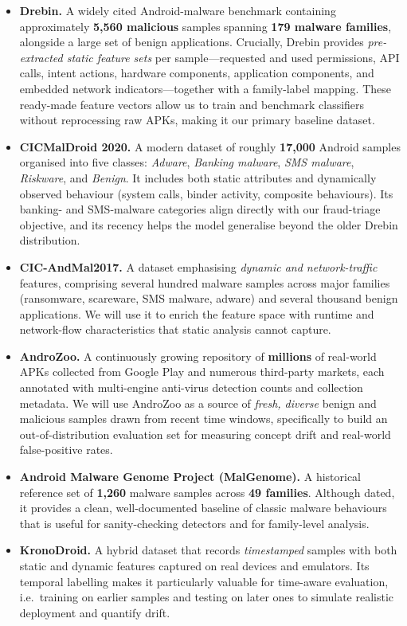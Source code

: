 \documentclass[11pt,a4paper]{article}
\newcommand{\dsname}[1]{\textbf{#1}}
\begin{document}
\begin{itemize}
    \item \dsname{Drebin.} A widely cited Android-malware benchmark containing approximately \textbf{5{,}560 malicious} samples spanning \textbf{179 malware families}, alongside a large set of benign applications. Crucially, Drebin provides \emph{pre-extracted static feature sets} per sample---requested and used permissions, API calls, intent actions, hardware components, application components, and embedded network indicators---together with a family-label mapping. These ready-made feature vectors allow us to train and benchmark classifiers without reprocessing raw APKs, making it our primary baseline dataset.
    \item \dsname{CICMalDroid 2020.} A modern dataset of roughly \textbf{17{,}000} Android samples organised into five classes: \emph{Adware}, \emph{Banking malware}, \emph{SMS malware}, \emph{Riskware}, and \emph{Benign}. It includes both static attributes and dynamically observed behaviour (system calls, binder activity, composite behaviours). Its banking- and SMS-malware categories align directly with our fraud-triage objective, and its recency helps the model generalise beyond the older Drebin distribution.
    \item \dsname{CIC-AndMal2017.} A dataset emphasising \emph{dynamic and network-traffic} features, comprising several hundred malware samples across major families (ransomware, scareware, SMS malware, adware) and several thousand benign applications. We will use it to enrich the feature space with runtime and network-flow characteristics that static analysis cannot capture.
    \item \dsname{AndroZoo.} A continuously growing repository of \textbf{millions} of real-world APKs collected from Google Play and numerous third-party markets, each annotated with multi-engine anti-virus detection counts and collection metadata. We will use AndroZoo as a source of \emph{fresh, diverse} benign and malicious samples drawn from recent time windows, specifically to build an out-of-distribution evaluation set for measuring concept drift and real-world false-positive rates.
    \item \dsname{Android Malware Genome Project (MalGenome).} A historical reference set of \textbf{1{,}260} malware samples across \textbf{49 families}. Although dated, it provides a clean, well-documented baseline of classic malware behaviours that is useful for sanity-checking detectors and for family-level analysis.
    \item \dsname{KronoDroid.} A hybrid dataset that records \emph{timestamped} samples with both static and dynamic features captured on real devices and emulators. Its temporal labelling makes it particularly valuable for time-aware evaluation, i.e.\ training on earlier samples and testing on later ones to simulate realistic deployment and quantify drift.
\end{itemize}
\end{document}
